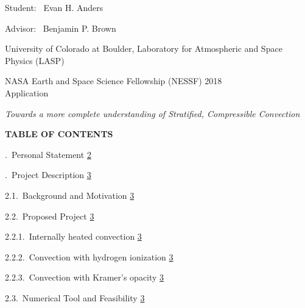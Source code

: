 \documentclass[12pt]{article}
\begin{document}
\begin{center}

\vspace*{0.07in}
Student: \, Evan H. Anders\hspace{0.6cm}

Advisor: \, Benjamin P. Brown

\vspace*{0.15in}
University of Colorado at Boulder, Laboratory for Atmospheric and Space Physics (LASP)

\vspace*{0.15in}
NASA Earth and Space Science Fellowship (NESSF) 2018 \\
Application

\vspace*{0.39in}
{\em Towards a more complete understanding of Stratified, Compressible Convection}

\vspace*{0.44in}
{\bf TABLE OF CONTENTS}
\end{center}

\vspace*{0.33in}
.$\,$ Personal Statement
\dotfill \hyperlink{page.2}{2}

\vspace*{0.06in}
.$\,$ Project Description
\dotfill \hyperlink{page.3}{3}

\vspace*{0.06in}
\noindent\hspace*{0.25in}
2.1.$\,$ Background and Motivation
\dotfill \hyperlink{page.3}{3}

\vspace*{0.06in}
\noindent\hspace*{0.25in}
2.2.$\,$ Proposed Project
\dotfill \hyperlink{page.3}{3}

\vspace*{0.06in}
\noindent\hspace*{0.50in}
2.2.1.$\,$ Internally heated convection
\dotfill \hyperlink{page.3}{3}

\vspace*{0.06in}
\noindent\hspace*{0.50in}
2.2.2.$\,$ Convection with hydrogen ionization
\dotfill \hyperlink{page.3}{3}

\vspace*{0.06in}
\noindent\hspace*{0.50in}
2.2.3.$\,$ Convection with Kramer's opacity
\dotfill \hyperlink{page.3}{3}

\vspace*{0.06in}
\noindent\hspace*{0.25in}
2.3.$\,$ Numerical Tool and Feasibility
\dotfill \hyperlink{page.3}{3}
\end{document}
